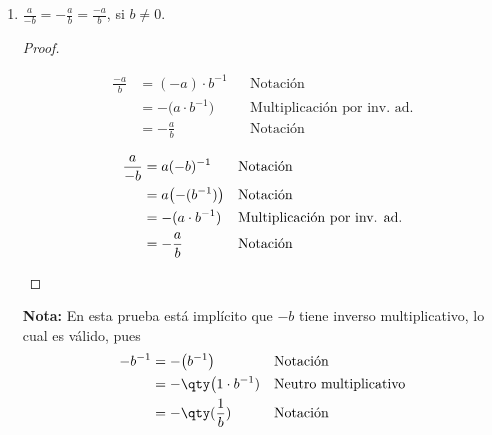 \documentclass[11pt]{article}
\begin{document}
\begin{enumerate}[label=\alph*)]
    \item $\frac{a}{-b} = -\frac{a}{b}=\frac{-a}{b}$, si $b\neq 0$.
    \vspace{-1em}\begin{proof} \leavevmode
        \begin{center}\vspace{-2em}
            \begin{minipage}[t]{.5\linewidth}
                \begin{align*}
                    \frac{-a}{b} &= (-a)\cdot b^{-1} && \text{Notación}\\
                    &= - \bigl(a\cdot b^{-1}\bigr) && \text{Multiplicación por inv. ad.}\\
                    &= -\frac{a}{b} && \text{Notación} 
                \end{align*}
            \end{minipage}%
            \begin{minipage}[t]{.5\linewidth}
                \begin{align*}
                    \frac{a}{-b} &= a(-b)^{-1} && \text{Notación}\\
            &= a\bigl(-(b^{-1})\bigr) && \text{Notación}\\
            &= -(a\cdot b^{-1}) && \text{Multiplicación por inv. ad.}\\
            &= -\frac{a}{b} && \text{Notación} \qedhere
                \end{align*}
            \end{minipage}
            \end{center}    
    \end{proof} \vspace{-1em}
    \textbf{Nota:} En esta prueba está implícito que $-b$ tiene inverso multiplicativo, lo cual es válido, pues\begin{align*}
        -b^{-1}&=-\bigl(b^{-1}\bigr) && \text{Notación}\\
        &= -\qty\big(1\cdot b^{-1}) && \text{Neutro multiplicativo}\\
        &= - \qty(\frac{1}{b}) && \text{Notación}
    \end{align*}

\end{enumerate}
\end{document}
